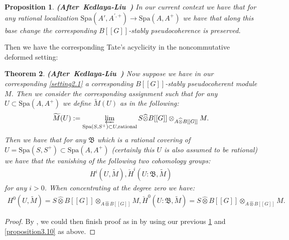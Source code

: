 \documentclass[12pt]{amsart}
\newtheorem{theorem}{Theorem}[section]
\newtheorem{proposition}[theorem]{Proposition}
\theoremstyle{definition}
\numberwithin{equation}{section}
\begin{document}
\begin{proposition} \mbox{\bf{(After Kedlaya-Liu \cite[Theorem 2.4.15]{KL2})}} \label{proposition3.11}
In our current context we have that for any rational localization $\mathrm{Spa}(A',A^{',+})\rightarrow \mathrm{Spa}(A,A^+)$ we have that along this base change the corresponding $B[[G]]$-stably pseudocoherence is preserved.	
\end{proposition}



\indent Then we have the corresponding Tate's acyclicity in the noncommutative deformed setting:

\begin{theorem}\mbox{\bf{(After Kedlaya-Liu \cite[Theorem 2.5.1]{KL2})}} \label{theorem3.12} Now suppose we have in our corresponding \cref{setting2.1} a corresponding $B[[G]]$-stably pseudocoherent module $M$. Then we consider the corresponding assignment such that for any $U\subset \mathrm{Spa}(A,A^+)$ we define $\widetilde{M}(U)$ as in the following:
\begin{align}
\widetilde{M}(U):=\varprojlim_{\mathrm{Spa}(S,S^+)\subset U,\mathrm{rational}} S\widehat{\otimes}B[[G]]\otimes_{A\widehat{\otimes}B[[G]]}M.	
\end{align}
Then we have that for any $\mathfrak{B}$ which is a rational covering of $U=\mathrm{Spa}(S,S^+)\subset \mathrm{Spa}(A,A^+)$ (certainly this $U$ is also assumed to be rational) we have that the vanishing of the following two cohomology groups:
\begin{align}
H^i(U,\widetilde{M}), \check{H}^i(U:\mathfrak{B},\widetilde{M})
\end{align}
for any $i>0$. When concentrating at the degree zero we have:
\begin{align}
H^0(U,\widetilde{M})=S\widehat{\otimes}B[[G]]\otimes_{A\widehat{\otimes}B[[G]]}M, \check{H}^0(U:\mathfrak{B},\widetilde{M})=S\widehat{\otimes}B[[G]]\otimes_{A\widehat{\otimes}B[[G]]}M.
\end{align}
	
\end{theorem}




 	

\begin{proof}
By \cite[Propositions 2.4.20-2.4.21]{KL1}, we could then finish proof as in \cite[Theorem 2.5.1]{KL2} by using our previous \cref{proposition3.11} and \cref{proposition3.10} as above.	
\end{proof}
\end{document}
